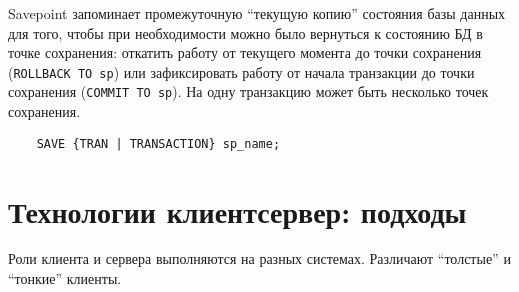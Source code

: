 Savepoint запоминает промежуточную ``текущую копию'' состояния базы данных для того, чтобы при необходимости можно было вернуться к состоянию БД в точке сохранения: откатить работу от текущего момента до точки сохранения (\texttt{ROLLBACK TO sp}) или зафиксировать работу от начала транзакции до точки сохранения (\texttt{COMMIT TO sp}).
На одну транзакцию может быть несколько точек сохранения.

\begin{verbatim}
	SAVE {TRAN | TRANSACTION} sp_name;
\end{verbatim}

\section{Технологии клиентсервер: подходы}

Роли клиента и сервера выполняются на разных системах.
Различают ``толстые'' и ``тонкие'' клиенты.

